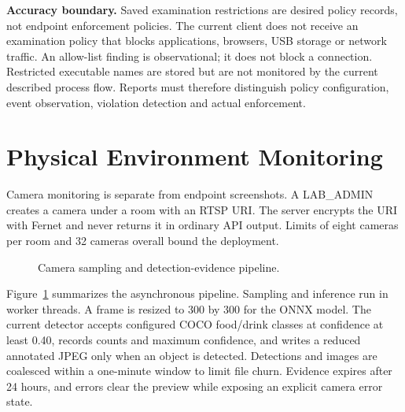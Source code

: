 \documentclass[12pt,a4paper]{report}
\begin{document}
\textbf{Accuracy boundary.} Saved examination restrictions are desired policy
records, not endpoint enforcement policies. The current client does not receive
an examination policy that blocks applications, browsers, USB storage or
network traffic. An allow-list finding is observational; it does not block a
connection. Restricted executable names are stored but are not monitored by
the current described process flow. Reports must therefore distinguish policy
configuration, event observation, violation detection and actual enforcement.

\section{Physical Environment Monitoring}
Camera monitoring is separate from endpoint screenshots. A LAB\_ADMIN creates
a camera under a room with an RTSP URI. The server encrypts the URI with
Fernet and never returns it in ordinary API output. Limits of eight cameras
per room and 32 cameras overall bound the deployment.

\begin{figure}[H]
\centering
{}
\caption{Camera sampling and detection-evidence pipeline.}
\label{fig:camera-detection-pipeline}
\end{figure}

Figure~\ref{fig:camera-detection-pipeline} summarizes the asynchronous
pipeline. Sampling and inference run in worker threads. A frame is resized to
300 by 300 for the ONNX model. The current detector accepts configured COCO
food/drink classes at confidence at least 0.40, records counts and maximum
confidence, and writes a reduced annotated JPEG only when an object is
detected. Detections and images are coalesced within a one-minute window to
limit file churn. Evidence expires after 24 hours, and errors clear the
preview while exposing an explicit camera error state.
\end{document}
